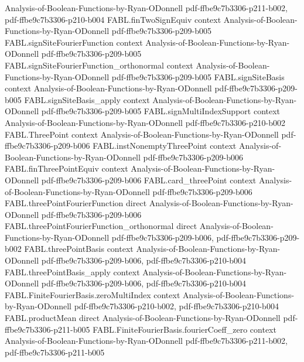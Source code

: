 \begin{theorem}
  {Analysis-of-Boolean-Functions-by-Ryan-ODonnell}
  {pdf-ffbe9c7b3306-p211-b002,
    pdf-ffbe9c7b3306-p210-b004}
\proofstep
  {FABL.finTwoSignEquiv}
  {context}
  {Analysis-of-Boolean-Functions-by-Ryan-ODonnell}
  {pdf-ffbe9c7b3306-p209-b005}
\proofstep
  {FABL.signSiteFourierFunction}
  {context}
  {Analysis-of-Boolean-Functions-by-Ryan-ODonnell}
  {pdf-ffbe9c7b3306-p209-b005}
\proofstep
  {FABL.signSiteFourierFunction_orthonormal}
  {context}
  {Analysis-of-Boolean-Functions-by-Ryan-ODonnell}
  {pdf-ffbe9c7b3306-p209-b005}
\proofstep
  {FABL.signSiteBasis}
  {context}
  {Analysis-of-Boolean-Functions-by-Ryan-ODonnell}
  {pdf-ffbe9c7b3306-p209-b005}
\proofstep
  {FABL.signSiteBasis_apply}
  {context}
  {Analysis-of-Boolean-Functions-by-Ryan-ODonnell}
  {pdf-ffbe9c7b3306-p209-b005}
\proofstep
  {FABL.signMultiIndexSupport}
  {context}
  {Analysis-of-Boolean-Functions-by-Ryan-ODonnell}
  {pdf-ffbe9c7b3306-p210-b002}
\proofstep
  {FABL.ThreePoint}
  {context}
  {Analysis-of-Boolean-Functions-by-Ryan-ODonnell}
  {pdf-ffbe9c7b3306-p209-b006}
\proofstep
  {FABL.instNonemptyThreePoint}
  {context}
  {Analysis-of-Boolean-Functions-by-Ryan-ODonnell}
  {pdf-ffbe9c7b3306-p209-b006}
\proofstep
  {FABL.finThreePointEquiv}
  {context}
  {Analysis-of-Boolean-Functions-by-Ryan-ODonnell}
  {pdf-ffbe9c7b3306-p209-b006}
\proofstep
  {FABL.card_threePoint}
  {context}
  {Analysis-of-Boolean-Functions-by-Ryan-ODonnell}
  {pdf-ffbe9c7b3306-p209-b006}
\proofstep
  {FABL.threePointFourierFunction}
  {direct}
  {Analysis-of-Boolean-Functions-by-Ryan-ODonnell}
  {pdf-ffbe9c7b3306-p209-b006}
\proofstep
  {FABL.threePointFourierFunction_orthonormal}
  {direct}
  {Analysis-of-Boolean-Functions-by-Ryan-ODonnell}
  {pdf-ffbe9c7b3306-p209-b006,
    pdf-ffbe9c7b3306-p209-b002}
\proofstep
  {FABL.threePointBasis}
  {context}
  {Analysis-of-Boolean-Functions-by-Ryan-ODonnell}
  {pdf-ffbe9c7b3306-p209-b006,
    pdf-ffbe9c7b3306-p210-b004}
\proofstep
  {FABL.threePointBasis_apply}
  {context}
  {Analysis-of-Boolean-Functions-by-Ryan-ODonnell}
  {pdf-ffbe9c7b3306-p209-b006,
    pdf-ffbe9c7b3306-p210-b004}
\proofstep
  {FABL.FiniteFourierBasis.zeroMultiIndex}
  {context}
  {Analysis-of-Boolean-Functions-by-Ryan-ODonnell}
  {pdf-ffbe9c7b3306-p210-b002,
    pdf-ffbe9c7b3306-p210-b004}
\proofstep
  {FABL.productMean}
  {direct}
  {Analysis-of-Boolean-Functions-by-Ryan-ODonnell}
  {pdf-ffbe9c7b3306-p211-b005}
\proofstep
  {FABL.FiniteFourierBasis.fourierCoeff_zero}
  {context}
  {Analysis-of-Boolean-Functions-by-Ryan-ODonnell}
  {pdf-ffbe9c7b3306-p211-b002,
    pdf-ffbe9c7b3306-p211-b005}
\proofstep

\end{theorem}
